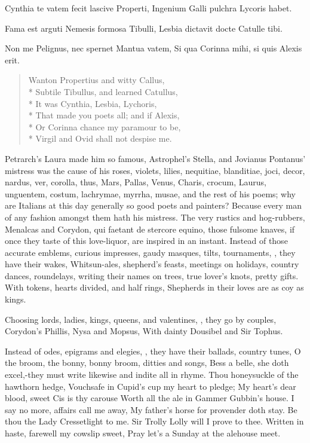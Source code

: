 {Cynthia te vatem fecit lascive Properti,
Ingenium Galli pulchra Lycoris habet.

Fama est arguti Nemesis formosa Tibulli,
Lesbia dictavit docte Catulle tibi.

Non me Pelignus, nec spernet Mantua vatem,
Si qua Corinna mihi, si quis Alexis erit.


\begin{verse}
Wanton Propertius and witty Callus,\\*
Subtile Tibullus, and learned Catullus,\\*
It was Cynthia, Lesbia, Lychoris,\\*
That made you poets all; and if Alexis,\\*
Or Corinna chance my paramour to be,\\*
Virgil and Ovid shall not despise me.
\end{verse}


Petrarch's Laura made him so famous, Astrophel's Stella, and Jovianus
Pontanus' mistress was the cause of his roses, violets, lilies,
nequitiae, blanditiae, joci, decor, nardus, ver, corolla, thus, Mars,
Pallas, Venus, Charis, crocum, Laurus, unguentem, costum, lachrymae,
myrrha, musae, \etc{} and the rest of his poems; why are Italians at this
day generally so good poets and painters? Because every man of any
fashion amongst them hath his mistress. The very rustics and
hog-rubbers, Menalcas and Corydon, qui faetant de stercore equino,
those fulsome knaves, if once they taste of this love-liquor, are
inspired in an instant. Instead of those accurate emblems, curious
impresses, gaudy masques, tilts, tournaments, \etc{}, they have their
wakes, Whitsun-ales, shepherd's feasts, meetings on holidays, country
dances, roundelays, writing their names on trees, true lover's
knots, pretty gifts.
With tokens, hearts divided, and half rings,
Shepherds in their loves are as coy as kings.

Choosing lords, ladies, kings, queens, and valentines, \etc{}, they go by
couples,
Corydon's Phillis, Nysa and Mopsus,
With dainty Dousibel and Sir Tophus.

Instead of odes, epigrams and elegies, \etc{}, they have their ballads,
country tunes, O the broom, the bonny, bonny broom, ditties and songs,
Bess a belle, she doth excel,-they must write likewise and indite all
in rhyme.
Thou honeysuckle of the hawthorn hedge,
Vouchsafe in Cupid's cup my heart to pledge;
My heart's dear blood, sweet Cis is thy carouse
Worth all the ale in Gammer Gubbin's house.
I say no more, affairs call me away,
My father's horse for provender doth stay.
Be thou the Lady Cressetlight to me.
Sir Trolly Lolly will I prove to thee.
Written in haste, farewell my cowslip sweet,
Pray let's a Sunday at the alehouse meet.

}
